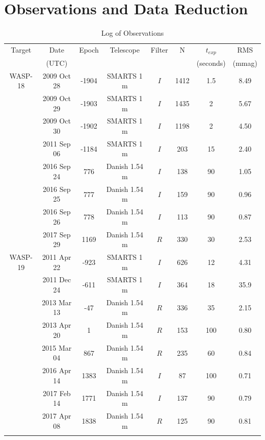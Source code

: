 \section{Observations and Data Reduction}\label{obs}

\begin{table}
\caption{Log of Observations}             
\label{log_table}      
\centering          
\begin{threeparttable}
\begin{tabular}{cccccccc}
\hline\hline       
Target & Date & Epoch\tnote{a} & Telescope & Filter & N & $t_{exp}$\tnote{b} & RMS\tnote{c} \\
& (UTC) &       &           &       &                   & (seconds) & (mmag)\\
\hline  
WASP-18 & 2009 Oct 28 &-1904 & SMARTS 1 m & $I$ & 1412 & 1.5 & 8.49  \\
 				& 2009 Oct 29 & -1903 & SMARTS 1 m & $I$ & 1435 & 2 & 5.67 \\
				& 2009 Oct 30 & -1902 & SMARTS 1 m & $I$ & 1198 & 2  & 4.50 \\
 				& 2011 Sep 06 & -1184 & SMARTS 1 m & $I$ & 203 & 15 & 2.40 \\
				& 2016 Sep 24\tnote{d} & 776 & Danish 1.54 m & $I$ & 138 & 90 & 1.05  \\
				& 2016 Sep 25\tnote{d} & 777 &Danish 1.54 m & $I$ & 159 & 90  & 0.96  \\
			    & 2016 Sep 26\tnote{d} & 778 & Danish 1.54 m & $I$ & 113 & 90 & 0.87  \\ \smallskip
				& 2017 Sep 29\tnote{d} & 1169 & Danish 1.54 m & $R$ & 330 & 30 & 2.53 \\
WASP-19 & 2011 Apr 22 & -923 & SMARTS 1 m &   $I$ &  626  & 12  & 4.31   \\
     & 2011 Dec 24 & -611 & SMARTS 1 m &   $I$ & 364  & 18  & 35.9 \\
     & 2013 Mar 13 & -47 & Danish 1.54 m & $R$ & 336 & 35 & 2.15\\
     & 2013 Apr 20 & 1 & Danish 1.54 m & $R$ & 153 & 100 & 0.80 \\
     & 2015 Mar 04 & 867 & Danish 1.54 m & $R$ & 235 & 60 & 0.84\\
     & 2016 Apr 14 & 1383 & Danish 1.54 m & $I$ & 87 & 100 & 0.71\\
     & 2017 Feb 14 & 1771 & Danish 1.54 m & $I$ & 137 & 90 & 0.79\\
     & 2017 Apr 08 & 1838 & Danish 1.54 m & $R$ & 125 & 90 & 0.81\\\smallskip

\end{tabular}
\end{threeparttable}
\end{table}
